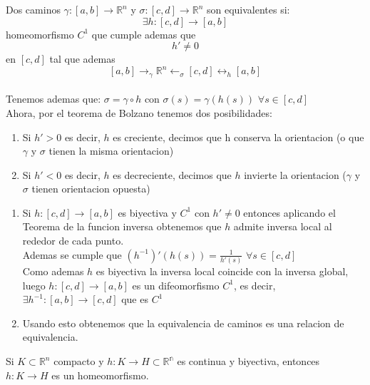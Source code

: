 \begin{definición}
Dos caminos $\gamma: [a,b] \to \mathbb{R}^n$ y $\sigma:[c,d] \to \mathbb{R}^n$ son equivalentes si: \\
$$ \exists h:[c,d] \to [a,b] $$ homeomorfismo $C^1$ que cumple ademas que \\
$$h' \neq 0$$ en $[c,d]$ tal que ademas $$[a,b] \to_{\gamma} \mathbb{R}^n \leftarrow_\sigma [c,d] \leftrightarrow_{h} [a,b]$$ \\
Tenemos ademas que: $\sigma = \gamma \circ h$ con $\sigma(s) = \gamma(h(s))$ $\forall s \in [c,d]$ \\
Ahora, por el teorema de Bolzano tenemos dos posibilidades:
\begin{enumerate}
    \item Si $h'>0$ es decir, $h$ es creciente, decimos que h conserva la orientacion (o
          que $\gamma$ y $\sigma$ tienen la misma orientacion)
    \item Si $h'<0$ es decir, $h$ es decreciente, decimos que $h$ invierte la orientacion
          ($\gamma$ y $\sigma$ tienen orientacion opuesta)
\end{enumerate}
\end{definición}

\begin{observación}
\vspace{-2.5em}
\begin{enumerate}
    \item Si $h:[c,d] \to [a,b]$ es biyectiva y $C^1$ con $h' \neq 0$ entonces aplicando
          el Teorema de la funcion inversa obtenemos que $h$ admite inversa local al
          rededor de cada punto. \\ Ademas se cumple que $(h^{-1})'(h(s)) =
              \frac{1}{h'(s)}$ $\forall s \in [c,d]$ \\ Como ademas $h$ es biyectiva la
          inversa local coincide con la inversa global, luego $h:[c,d] \to [a,b]$ es un
          difeomorfismo $C^1$, es decir, $\exists h^{-1}:[a,b] \to [c,d]$ que es $C^1$
    \item Usando esto obtenemos que la equivalencia de caminos es una relacion de
          equivalencia.
\end{enumerate}
\end{observación}

\begin{observación}
Si $K\subset \mathbb{R}^n$ compacto y $h:K \to H\subset \mathbb{R^n}$ es continua y biyectiva, entonces $h:K \to H$ es un homeomorfismo.
\end{observación}

